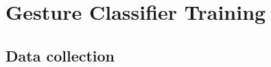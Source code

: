 \documentclass[review]{vgtc}                 %
\begin{document}
%





\section{Gesture Classifier Training}
\label{sec:training}
\subsection{Data collection}
\end{document}

